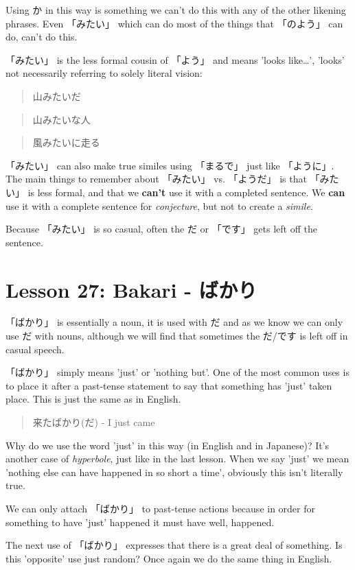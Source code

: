 \documentclass[11pt]{article}
\begin{document}
Using か in this way is something we can't do this with any of the other likening phrases. Even 「みたい」 which can do most of the things that 「のよう」 can do, can't do this.

「みたい」 is the less formal cousin of 「よう」 and means 'looks like\ldots{}', 'looks' not necessarily referring to solely literal vision:
\begin{quote}
山みたいだ
\end{quote}
\begin{quote}
山みたいな人
\end{quote}
\begin{quote}
風みたいに走る
\end{quote}
「みたい」 can also make true similes using 「まるで」 just like 「ように」. The main things to remember about 「みたい」 vs. 「ようだ」 is that 「みたい」 is less formal, and that we \textbf{can't} use it with a completed sentence. We \textbf{can} use it with a complete sentence for \emph{conjecture}, but not to create a \emph{simile}.

Because 「みたい」 is so casual, often the だ or 「です」 gets left off the sentence.
\section{Lesson 27: Bakari - ばかり}
\label{sec:org60e4d58}
「ばかり」 is essentially a noun, it is used with だ and as we know we can only use だ with nouns, although we will find that sometimes the だ/です is left off in casual speech.

「ばかり」 simply means 'just' or 'nothing but'. One of the most common uses is to place it after a past-tense statement to say that something has 'just' taken place. This is just the same as in English.
\begin{quote}
来たばかり(だ) - I just came
\end{quote}
Why do we use the word 'just' in this way (in English and in Japanese)? It's another case of \emph{hyperbole}, just like in the last lesson. When we say 'just' we mean 'nothing else can have happened in so short a time', obviously this isn't literally true.

We can only attach 「ばかり」 to past-tense actions because in order for something to have 'just' happened it must have well, happened.

The next use of 「ばかり」 expresses that there is a great deal of something. Is this 'opposite' use just random? Once again we do the same thing in English.
\end{document}
